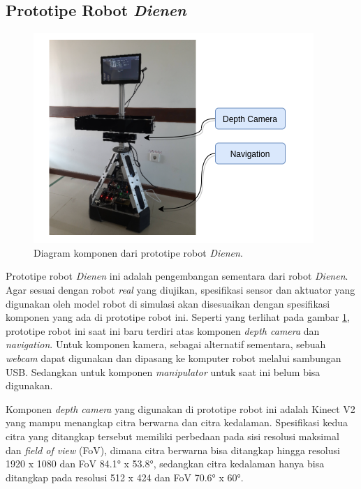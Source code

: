 \subsection{Prototipe Robot \emph{Dienen}}
\label{subsec:prototiperobotdienen}

\begin{figure} [ht]
  \centering
  \includegraphics[scale=0.5]{gambar/komponen-prototipe-robot.png}
  \caption{Diagram komponen dari prototipe robot \emph{Dienen}.}
  \label{fig:komponenprototiperobot}
\end{figure}

Prototipe robot \emph{Dienen} ini adalah pengembangan sementara dari robot \emph{Dienen}.
Agar sesuai dengan robot \emph{real} yang diujikan,
  spesifikasi sensor dan aktuator yang digunakan oleh model robot di simulasi akan disesuaikan dengan spesifikasi komponen yang ada di prototipe robot ini.
Seperti yang terlihat pada gambar \ref{fig:komponenprototiperobot},
  prototipe robot ini saat ini baru terdiri atas komponen \emph{depth camera} dan \emph{navigation}.
Untuk komponen kamera, sebagai alternatif sementara, sebuah \emph{webcam} dapat digunakan dan dipasang ke komputer robot melalui sambungan USB.
Sedangkan untuk komponen \emph{manipulator} untuk saat ini belum bisa digunakan.

Komponen \emph{depth camera} yang digunakan di prototipe robot ini adalah Kinect V2 yang mampu menangkap citra berwarna dan citra kedalaman.
Spesifikasi kedua citra yang ditangkap tersebut memiliki perbedaan pada sisi resolusi maksimal dan \emph{field of view} (FoV),
  dimana citra berwarna bisa ditangkap hingga resolusi 1920 x 1080 dan FoV 84.1° x 53.8°,
  sedangkan citra kedalaman hanya bisa ditangkap pada resolusi 512 x 424 dan FoV 70.6° x 60°.

